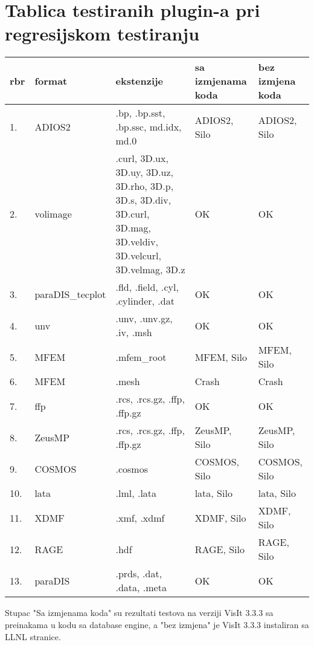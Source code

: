 \documentclass[times, utf8, zavrsni]{fer}
\begin{document}
\appendix
\chapter{Tablica testiranih plugin-a pri regresijskom testiranju}
\begin{longtable}{|l|p{70pt}|p{100pt}|p{100pt}| p{100pt}|}
	\hline
	\textbf{rbr} & \textbf{format} & \textbf{ekstenzije} & \textbf{sa izmjenama koda} & \textbf{bez izmjena koda}\\
	\hline
	\endhead %
	1. & ADIOS2 & .bp, .bp.sst, .bp.ssc, md.idx, md.0 & \cellcolor{yellow} ADIOS2, Silo & \cellcolor{yellow} ADIOS2, Silo\\
	\hline
	2. & volimage & .curl, 3D.ux, 3D.uy, 3D.uz, 3D.rho, 3D.p, 3D.s, 3D.div, 3D.curl, 3D.mag, 3D.veldiv, 3D.velcurl, 3D.velmag, 3D.z & \cellcolor{green} OK & \cellcolor{green}OK\\
	\hline
	3. & paraDIS\_tecplot & .fld, .field, .cyl, .cylinder, .dat & \cellcolor{green} OK & \cellcolor{green} OK\\
	\hline
	4. & unv & .unv, .unv.gz, .iv, .msh & \cellcolor{green} OK & \cellcolor{green} OK\\
	\hline
	5. & MFEM & .mfem\_root & \cellcolor{yellow} MFEM, Silo & \cellcolor{yellow} MFEM, Silo\\
	\hline
	6. & MFEM & .mesh & \cellcolor{red} Crash & \cellcolor{red} Crash\\
	\hline
	7. & ffp & .rcs, .rcs.gz, .ffp, .ffp.gz & \cellcolor{green} OK & \cellcolor{green} OK\\
	\hline
	8. & ZeusMP & .rcs, .rcs.gz, .ffp, .ffp.gz & \cellcolor{yellow} ZeusMP, Silo & \cellcolor{yellow} ZeusMP, Silo\\
	\hline
	9. & COSMOS & .cosmos & \cellcolor{yellow} COSMOS, Silo & \cellcolor{yellow} COSMOS, Silo\\
	\hline
	\hline
	10. & lata & .lml, .lata & \cellcolor{yellow} lata, Silo & \cellcolor{yellow} lata, Silo\\
	\hline
	11. & XDMF & .xmf, .xdmf & \cellcolor{yellow} XDMF, Silo & \cellcolor{yellow} XDMF, Silo\\
	\hline
	12. & RAGE & .hdf & \cellcolor{yellow} RAGE, Silo & \cellcolor{yellow} RAGE, Silo\\
	\hline
	13. & paraDIS & .prds, .dat, .data, .meta & \cellcolor{green} OK & \cellcolor{green} OK \\
	\hline
\end{longtable}

	Stupac "Sa izmjenama koda" su rezultati testova na verziji VisIt 3.3.3 sa preinakama u kodu sa database engine, a "bez izmjena" je VisIt 3.3.3 instaliran sa LLNL stranice.
\end{document}

